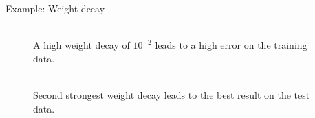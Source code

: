\begin{vbframe}{Example: Weight decay}
\begin{figure}
\centering
{}
\\
A high weight decay of $10^{-2}$ leads to a high error on the training data.
\end{figure}

\framebreak

\begin{figure}
\centering
{}
\\
Second strongest weight decay leads to the best result on the test data.
\end{figure}
\end{vbframe}
  
